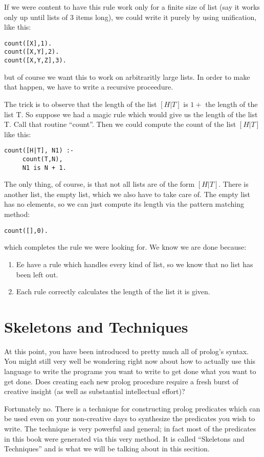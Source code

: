 \documentclass{book}[9pt]
\begin{document}
If we
were content to have this rule work only for a finite size of list (say 
it works only up until lists of 3 items long),
we could write it purely by using unification, like this:
\begin{verbatim}
count([X],1).
count([X,Y],2).
count([X,Y,Z],3).
\end{verbatim}
\noindent but of course we want this to work on arbitraritly large lists.
In order to make that happen, we have to write a recursive proceedure.

The trick is to observe that the length of the list $[H|T]$ is $1 +$ the length
of the list T.  So suppose we had a magic rule which would give us the length
of the list T.  Call that routine ``count''.  Then we could compute the
count of the list $[H|T]$ like this:
\begin{verbatim}
count([H|T], N1) :-
     count(T,N),
     N1 is N + 1.
\end{verbatim}
\noindent  The only thing, of course, is that not all lists are of the form $[H|T]$.  There is another list,
the empty list, which we also have to take care of.  The empty list has no elements, so we can just compute
its length via the pattern matching method:
\begin{verbatim}
count([],0).
\end{verbatim}
\noindent  which completes the rule we were looking for.  We know we are done because:
\begin{enumerate}
\item Ee have a rule which handles every kind of list, so we know that no list has been left out.
\item Each rule correctly calculates the length of the list it is given.
\end{enumerate}

\section{Skeletons and Techniques}

At this point, you have been introduced to pretty much all of prolog's
syntax.  You might still very well be wondering right now about how to
actually use this language to write the programs you want to write to
get done what you want to get done.  Does creating each new prolog
procedure require a fresh burst of creative insight (as well as
substantial intellectual effort)?

Fortunately no. There is a technique for constructing prolog
predicates which can be used even on your non-creative days to
synthesize the predicates you wish to write.  The technique is very
powerful and general; in fact most of the predicates in this book were
generated via this very method.  It is called ``Skeletons and
Techniques'' and is what we will be talking about in this secition.
\end{document}
